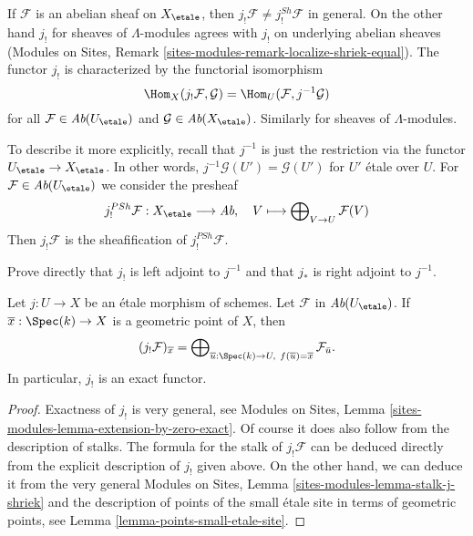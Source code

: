 \noindent
If $\mathcal{F}$ is an abelian sheaf on $X_\etale$, then
$j_!\mathcal{F} \not = j_!^{Sh}\mathcal{F}$ in general. On the other hand
$j_!$ for sheaves of $\Lambda$-modules agrees with $j_!$ on underlying
abelian sheaves
(Modules on Sites, Remark \ref{sites-modules-remark-localize-shriek-equal}).
The functor $j_!$ is characterized by the functorial isomorphism
$$
\Hom_X(j_!\mathcal{F}, \mathcal{G}) = \Hom_U(\mathcal{F}, j^{-1}\mathcal{G})
$$
for all $\mathcal{F} \in \textit{Ab}(U_\etale)$ and
$\mathcal{G} \in \textit{Ab}(X_\etale)$. Similarly for
sheaves of $\Lambda$-modules.

\medskip\noindent
To describe it more explicitly, recall that $j^{-1}$ is just the restriction
via the functor $U_\etale \to X_\etale$. In other words,
$j^{-1}\mathcal{G}(U') = \mathcal{G}(U')$ for $U'$ \'etale over $U$.
For $\mathcal{F} \in \textit{Ab}(U_\etale)$
we consider the presheaf
$$
j_!^{PSh}\mathcal{F} : X_\etale \longrightarrow \textit{Ab},
\quad
V \longmapsto \bigoplus\nolimits_{V \to U} \mathcal{F}(V)
$$
Then $j_!\mathcal{F}$ is the sheafification of $j_!^{PSh}\mathcal{F}$.

\begin{exercise}
\label{exercise-jshriek-direct}
Prove directly that $j_!$ is left adjoint to $j^{-1}$ and that $j_*$ is right
adjoint to $j^{-1}$.
\end{exercise}

\begin{proposition}
\label{proposition-describe-jshriek}
Let $j : U \to X$ be an \'etale morphism of schemes.
Let $\mathcal{F}$ in $\textit{Ab}(U_\etale)$.
If $\overline{x} : \Spec(k) \to X$ is a geometric point of $X$, then 
$$
(j_!\mathcal{F})_{\overline{x}} =
\bigoplus\nolimits_{\overline{u} : \Spec(k) \to U,\ f(\overline{u}) =
\overline{x}} \mathcal{F}_{\bar{u}}.
$$
In particular, $j_!$ is an exact functor.
\end{proposition}

\begin{proof}
Exactness of $j_!$ is very general, see Modules on Sites, 
Lemma \ref{sites-modules-lemma-extension-by-zero-exact}.
Of course it does also follow from the description of stalks.
The formula for the stalk of $j_!\mathcal{F}$ can be deduced
directly from the explicit description of $j_!$ given above.
On the other hand, we can deduce it from the very general
Modules on Sites, Lemma \ref{sites-modules-lemma-stalk-j-shriek}
and the description of points of the small \'etale site
in terms of geometric points, see
Lemma \ref{lemma-points-small-etale-site}.
\end{proof}


